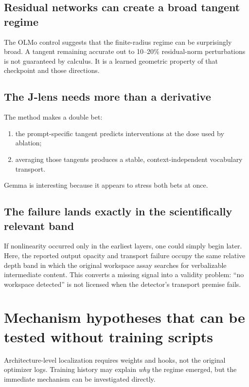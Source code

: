 \documentclass[11pt]{article}
\theoremstyle{definition}
\theoremstyle{remark}
\begin{document}
\subsection{Residual networks can create a broad tangent regime}
The OLMo control suggests that the finite-radius regime can be surprisingly broad. A tangent remaining accurate out to 10--20\% residual-norm perturbations is not guaranteed by calculus. It is a learned geometric property of that checkpoint and those directions.

\subsection{The J-lens needs more than a derivative}
The method makes a double bet:
\begin{enumerate}
  \item the prompt-specific tangent predicts interventions at the dose used by ablation;
  \item averaging those tangents produces a stable, context-independent vocabulary transport.
\end{enumerate}
Gemma is interesting because it appears to stress both bets at once.

\subsection{The failure lands exactly in the scientifically relevant band}
If nonlinearity occurred only in the earliest layers, one could simply begin later. Here, the reported output opacity and transport failure occupy the same relative depth band in which the original workspace assay searches for verbalizable intermediate content. This converts a missing signal into a validity problem: ``no workspace detected'' is not licensed when the detector's transport premise fails.

\section{Mechanism hypotheses that can be tested without training scripts}

Architecture-level localization requires weights and hooks, not the original optimizer logs. Training history may explain \emph{why} the regime emerged, but the immediate mechanism can be investigated directly.
\end{document}
